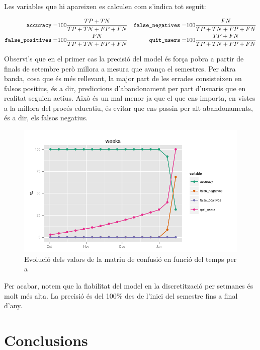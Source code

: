 \documentclass[
	a4paper,
	twoside,
	justified
]{tufte-book}
\begin{document}
Les variables que hi apareixen es calculen com s'indica tot seguit:

\begin{align*}
\texttt{accuracy} = & 100 \frac{TP + TN}{TP + TN + FP + FN} & 
\texttt{false\_negatives} = & 100 \frac{FN}{TP + TN + FP + FN} \\
\texttt{false\_positives} = & 100 \frac{FN}{TP + TN + FP + FN} & 
\texttt{quit\_users} = & 100 \frac{TP + FN}{TP + TN + FP + FN} 
\end{align*}

Observi's que en el primer cas la precisió del model és força pobra a partir de finals de setembre però millora a mesura que avança el semestres. Per altra banda, cosa que és més rellevant, la major part de les errades consisteixen en falsos positius, és a dir, prediccions d'abandonament per part d'usuaris que en realitat seguien actius. Això és un mal menor ja que el que ens importa, en vistes a la millora del procés educatiu, és evitar que ens passin per alt abandonaments, és a dir, els falsos negatius.  

\begin{figure}
\begin{center}
\includegraphics{hmm_weeks_confusion_m_day}
\caption{
\label{graph:hmm_weeks_confusion_m_day}
	Evolució dels valors de la matriu de confusió en funció del temps per a 	
}
\end{center}
\end{figure}

Per acabar, notem que la fiabilitat del model en la discretització per setmanes és molt més alta. La precisió és del 100\% des de l'inici del semestre fins a final d'any.

\chapter{Conclusions}
\end{document}
